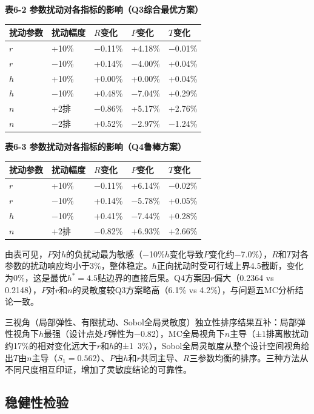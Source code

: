 \documentclass[withoutpreface]{cumcmthesis}
\begin{document}
\textbf{表6-2 参数扰动对各指标的影响（Q3综合最优方案）}

\begin{table}[htbp]
\centering
\small
\begin{tabularx}{\textwidth}{XXXXX}
\toprule
扰动参数 & 扰动幅度 & $R$变化 & $P$变化 & $T$变化 \\
\midrule
$r$ & +10\% & −0.11\% & +4.18\% & −0.01\% \\
$r$ & −10\% & +0.14\% & −4.00\% & +0.04\% \\
$h$ & +10\% & +0.00\% & +0.00\% & +0.04\% \\
$h$ & −10\% & +0.48\% & −7.04\% & +0.29\% \\
$n$ & +2排 & −0.86\% & +5.17\% & +2.76\% \\
$n$ & −2排 & +0.52\% & −2.97\% & −1.24\% \\
\bottomrule
\end{tabularx}
\end{table}
\textbf{表6-3 参数扰动对各指标的影响（Q4鲁棒方案）}

\begin{table}[htbp]
\centering
\small
\begin{tabularx}{\textwidth}{XXXXX}
\toprule
扰动参数 & 扰动幅度 & $R$变化 & $P$变化 & $T$变化 \\
\midrule
$r$ & +10\% & −0.11\% & +6.14\% & −0.02\% \\
$r$ & −10\% & +0.14\% & −5.78\% & +0.05\% \\
$h$ & −10\% & +0.41\% & −7.44\% & +0.28\% \\
$n$ & +2排 & −0.82\% & +6.93\% & +2.66\% \\
\bottomrule
\end{tabularx}
\end{table}
由表可见，$P$对$h$的负扰动最为敏感（−10\%$h$变化导致$P$变化约−7.0\%），$R$和$T$对各参数的扰动响应均小于3\%，整体稳定。$h$正向扰动时受可行域上界4.5截断，变化为0\%，这是最优$h^*=4.5$贴边界的直接后果。Q4方案因$r$偏大（0.2364 vs 0.2148），$P$对$r$和$n$的灵敏度较Q3方案略高（6.1\% vs 4.2\%），与问题五MC分析结论一致。

三视角（局部弹性、有限扰动、Sobol全局灵敏度）独立性排序结果互补：局部弹性视角下$h$最强（设计点处$P$弹性为−0.82），MC全局视角下$n$主导（±1排离散扰动约17\%的相对变化远大于$r$和$h$的±1~3\%），Sobol全局灵敏度从整个设计空间视角给出$T$由$n$主导（$S_1=0.562$）、$P$由$h$和$r$共同主导、$R$三参数均衡的排序。三种方法从不同尺度相互印证，增加了灵敏度结论的可靠性。

\subsection{稳健性检验}
\end{document}
